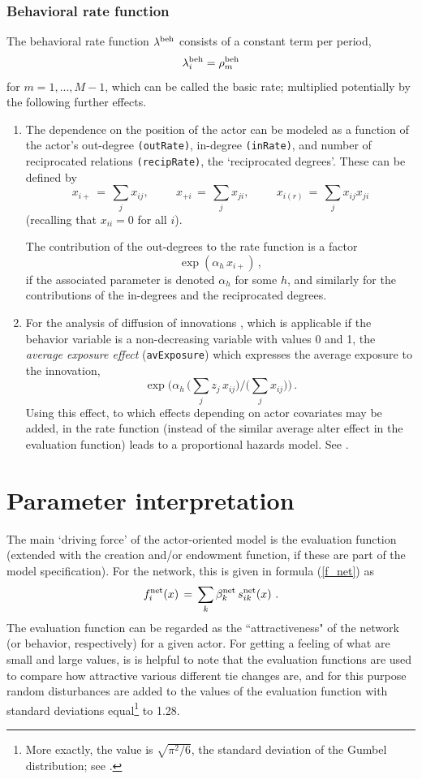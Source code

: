 \documentclass[a4paper,fleqn,11pt]{article}
\newcommand{\+}{\, + \,}
\begin{document}
\subsubsection{Behavioral rate function}
The behavioral rate function $\lambda^{\rm beh}$ consists of a
constant term per period, \[ \lambda^{\rm beh}_{i} = \rho^{\rm
beh}_m \] for $m = 1, ..., M-1$, which can be called the basic rate;
multiplied potentially by the following further effects.
\begin{enumerate}
 \item The dependence on the position of the actor can be modeled
 as a function of the actor's out-degree \texttt{(outRate)},
 in-degree \texttt{(inRate)}, and number
 of reciprocated relations \texttt{(recipRate)}, the `reciprocated degrees'.
 These can be defined by
 \[ x_{i+} \,=\, \sum_j x_{ij}, \phantom{abcde} x_{+i} \,=\, \sum_j x_{ji},
                \phantom{abcde} x_{i(r)} \,=\, \sum_j x_{ij}x_{ji} \]
 (recalling that $x_{ii} = 0$ for all $i$).

The contribution of the out-degrees to the rate function
is a factor
 \[ \exp( \alpha_h \, x_{i+})\,, \]
if the associated parameter is denoted $\alpha_h$ for some $h$,
and similarly for the contributions of the in-degrees and the
reciprocated degrees.

 \item For the analysis of diffusion of innovations
  \citep{Greenan12}, which is applicable if the behavior variable
  is a non-decreasing variable with values 0 and 1,
  the \emph{average exposure effect}
  (\texttt{avExposure}) which expresses the average exposure to the innovation,
 \[ \exp\Big( \alpha_h \, \big( \sum_j z_j \, x_{ij}\big)/\big(\sum_j x_{ij} \big) \Big)\, . \]
  Using this effect, to which effects depending on actor covariates may be added,
  in the rate function (instead of the similar
  average alter effect in the evaluation function) leads to a
  proportional hazards model. See \citet{Greenan12}.
\end{enumerate}




\newpage
\section{Parameter interpretation}
\label{S_interpret}

The main `driving force' of the actor-oriented model
is the evaluation function
(extended with the creation and/or endowment function, if these are
part of the model specification).
For the network, this is given in formula (\ref{f_net}) as
\[
f^{\rm net}_i(x) \, = \, \sum_k \beta^{\rm net}_k \, s^{\rm net}_{ik}(x)   \ .
\]
The evaluation function can be regarded as the ``attractiveness"
of the network (or behavior, respectively) for a given actor.
For getting a feeling of what are small and large values,
is is helpful to note that the evaluation functions are
used to compare how attractive various different tie changes are,
and for this purpose random disturbances are added
to the values of the evaluation function with standard deviations
equal\footnote{More exactly, the value is $\sqrt{\pi^2/6}$,
the standard deviation of the Gumbel
distribution; see \citet{Snijders01}.} to 1.28.
\end{document}
